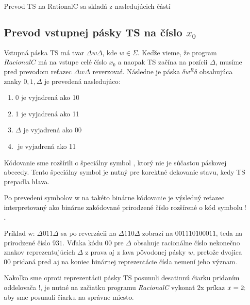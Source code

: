 \documentclass[10pt]{article}
\begin{document}
Prevod TS na RationalC sa skladá z nasledujúcich částí
\subsection*{Prevod vstupnej pásky TS na číslo $x_0$}
    Vstupná páska TS má tvar $\Delta w \Delta$, kde $w \in \Sigma$. Keďže vieme, že program
    $RacionalC$ má na vstupe celé číslo $x_0$ a naopak TS začína na pozícii $\Delta$, musíme
    pred prevodom reťazec $\Delta w \Delta$ reverzovať. 
    Následne je páska $\delta w^R \delta$ obsahujúca znaky $0,1,\Delta$ je prevedená nasledujúco:
    \begin{enumerate}
        \item 0 je vyjadrená ako 10
        \item 1 je vyjadrená ako 11
        \item $\Delta$ je vyjadrená ako 00
        \item $\!$ je vyjadrená ako 11
    \end{enumerate}
    Kódovanie sme rozšírili o špeciálny symbol $\!$, ktorý nie je súčasťou páskovej abecedy.
    Tento špeciálny symbol je nutný pre korektné dekovanie stavu, kedy TS prepadla hlava.

    Po prevedení symbolov w na takéto binárne kódovanie je výsledný reťazec interpretovaný ako
    binárne zakódované prirodzené číslo rozšírené o kód symbolu $!$.

    Príklad w: $\Delta011\Delta$ sa po reverzácii na $\Delta110\Delta$ zobrazí na $00 11 10 10 00
    11$, teda na prirodzené číslo $931$. Vďaka kódu $00$ pre $\Delta$ obsahuje racionálne číslo nekonečno znakov
    reprezentujúcich $\Delta$ z prava aj z ľava pôvodonej pásky $w$, pretože dvojica 00 pridaná
    pred aj na koniec binárnej reprezentácie čísla nemení jeho význam.

    Nakoľko sme oproti reprezentácii pásky TS posunuli desatinnú čiarku pridaním oddelovača $!$, je
    nutné na začiatku programu \textit{RacionalC} vykonať 2x príkaz $x \\= 2;$ aby sme posunuli čiarku na
    správne miesto.
\end{document}
